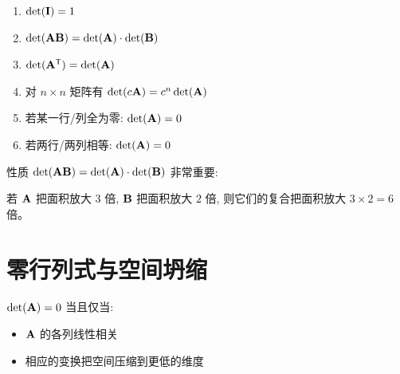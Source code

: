 \begin{theorem}[主要性质]
\begin{enumerate}
    \item $\det(\mathbf{I}) = 1$
    \item $\det(\mathbf{A}\mathbf{B}) = \det(\mathbf{A}) \cdot \det(\mathbf{B})$
    \item $\det(\mathbf{A}^{\mathsf{T}}) = \det(\mathbf{A})$
    \item 对 $n \times n$ 矩阵有 $\det(c\mathbf{A}) = c^n \det(\mathbf{A})$
    \item 若某一行/列全为零: $\det(\mathbf{A}) = 0$
    \item 若两行/两列相等: $\det(\mathbf{A}) = 0$
\end{enumerate}
\end{theorem}

\begin{intuition}
性质 $\det(\mathbf{A}\mathbf{B}) = \det(\mathbf{A}) \cdot \det(\mathbf{B})$ 非常重要:

若 $\mathbf{A}$ 把面积放大 $3$ 倍, $\mathbf{B}$ 把面积放大 $2$ 倍, 则它们的复合把面积放大 $3 \times 2 = 6$ 倍。
\end{intuition}

\section{零行列式与空间坍缩}

\begin{theorem}
$\det(\mathbf{A}) = 0$ 当且仅当:
\begin{itemize}
    \item $\mathbf{A}$ 的各列线性相关
    \item 相应的变换把空间压缩到更低的维度
\end{itemize}
\end{theorem}

\begin{center}
\end{center}

